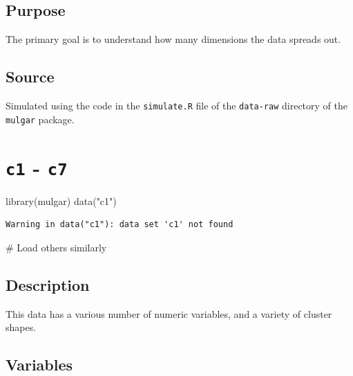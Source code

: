 \documentclass[
  letterpaper,
]{krantz}
\newenvironment{Shaded}{\begin{snugshade}}{\end{snugshade}}
\newcommand{\CommentTok}[1]{\textcolor[rgb]{0.37,0.37,0.37}{#1}}
\newcommand{\FunctionTok}[1]{\textcolor[rgb]{0.28,0.35,0.67}{#1}}
\newcommand{\NormalTok}[1]{\textcolor[rgb]{0.00,0.23,0.31}{#1}}
\newcommand{\StringTok}[1]{\textcolor[rgb]{0.13,0.47,0.30}{#1}}
\begin{document}
\subsection*{Purpose}\label{purpose-8}

The primary goal is to understand how many dimensions the data spreads
out.

\subsection*{Source}\label{source-8}

Simulated using the code in the \texttt{simulate.R} file of the
\texttt{data-raw} directory of the \texttt{mulgar} package.

\section{\texorpdfstring{\texttt{c1} -
\texttt{c7}}{c1 - c7}}\label{c1---c7}

\begin{Shaded}
\begin{Highlighting}[]
\FunctionTok{library}\NormalTok{(mulgar)}
\FunctionTok{data}\NormalTok{(}\StringTok{"c1"}\NormalTok{)}
\end{Highlighting}
\end{Shaded}

\begin{verbatim}
Warning in data("c1"): data set 'c1' not found
\end{verbatim}

\begin{Shaded}
\begin{Highlighting}[]
\CommentTok{\# Load others similarly}
\end{Highlighting}
\end{Shaded}

\subsection*{Description}\label{description-9}

This data has a various number of numeric variables, and a variety of
cluster shapes.

\subsection*{Variables}\label{variables-9}
\end{document}
